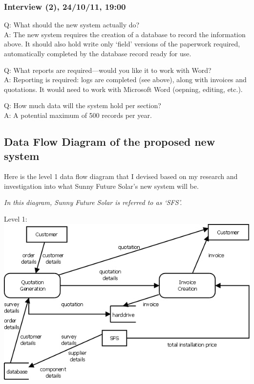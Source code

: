 			\subsubsection{Interview (2), 24\slash 10\slash 11, 19:00}
Q: What should the new system actually do?\\
A: The new system requires the creation of a database to record the information above.  It should also hold write only `field' versions of the paperwork required, automatically completed by the database record ready for use.

Q: What reports are required---would you like it to work with Word?\\
A: Reporting is required: logs are completed (see above), along with invoices and quotations.  It would need to work with Microsoft Word (oepning, editing, etc.).

Q: How much data will the system hold per section?\\
A: A potential maximum of 500 records per year.
		\subsection{Data Flow Diagram of the proposed new system}
Here is the level 1 data flow diagram that I devised based on my research and investigation into what Sunny Future Solar's new system will be.

\textsl{In this diagram, Sunny Future Solar is referred to as `SFS'.}

Level 1:\\
\includegraphics[scale=0.35]{dfd_new_one_n}
